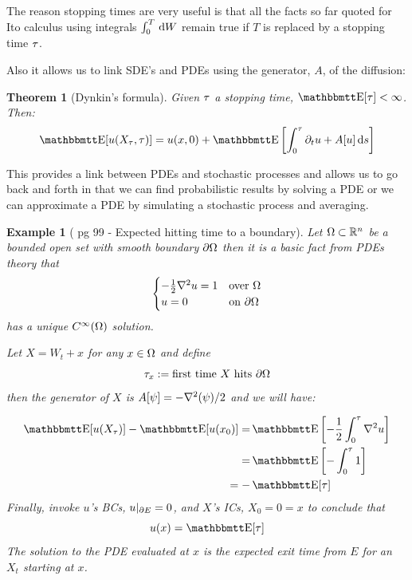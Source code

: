 \documentclass{article}
\newtheorem{thm}{Theorem}[section]
\newtheorem{ex}{Example}[thm]
\begin{document}
The reason stopping times are very useful is that all the facts so far quoted
for Ito calculus using integrals $\int_0^T \, \mathrm{d} W$ remain true if $T$ is
replaced by a stopping time ${\tau}$.
 
Also it allows us to link SDE's and PDEs using the generator, $A$, of the
diffusion: 
\begin{thm}[Dynkin's formula] Given ${\tau}$ a stopping time, $\Exp[\t] < \infty$.
Then:
$$
\Exp[u(X_\t, \t)] =
u(x, 0) + \Exp\left[\int_0^\t \di_t u + A[u] \intd{s}
\right]
 $$
\end{thm}
This provides a link between PDEs and stochastic processes and allows us to go
back and forth in that we can find probabilistic results by
solving a PDE or we can approximate a PDE by simulating a stochastic process
and averaging.

\begin{ex}[\cite{Evansb} pg 99 - Expected hitting time to a boundary]
\label{ex:mean_hitting_time}
 Let ${\Omega}
\subset { \mathbb{R} }^n$ be a bounded open set with smooth boundary ${\partial} {\Omega}$ then it is a
basic fact from PDEs theory that
\begin{equation}
\begin{cases}
-\frac{1}{2} { \nabla }^2 u = 1  & \text{over } {\Omega}
\\
u =  0 &\text{on } {\partial} {\Omega}
\end{cases}
\end{equation}
has a unique $C^\infty({\Omega})$ solution.

Let $X = W_t + x$ for any $x \in {\Omega}$ and define
 $${\tau}_x := \text{first time } X \text{ hits } {\partial} {\Omega}$$
then the generator of $X$ is $A[\psi] = -{ \nabla }^2(\psi)/2$ and we will
have:

\begin{align*}
\Exp[u(X_\t)] - \Exp[ u(x_0)] =& \Exp \left[ -\frac{1}{2}\int_0^\t \grad^2
u\right]
\\
=& \Exp \left[ - \int_0^\t 1
\right]
\\
=-&\Exp [\t]
\end{align*}
Finally, invoke $u$'s BCs, $u|_{{\partial} E} = 0$, and $X$'s ICs, $X_0=0 = x$ to
conclude that $$ u(x) = \Exp [\t]$$
The solution to the PDE evaluated at $x$ is the expected exit time from
$E$ for an $X_t$  starting at $x$.
\end{ex}
\end{document}
